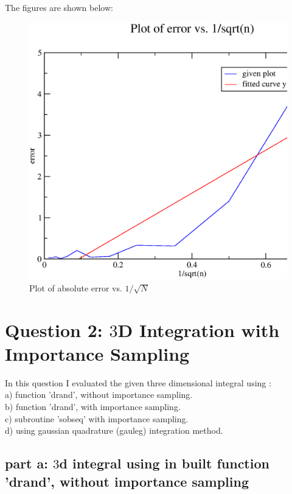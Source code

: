 \documentclass[11pt,a4paper,english]{article}
\begin{document}
	
	    The figures are shown below:\\
	\begin{figure}[h!]
	\centering
	\includegraphics [scale=0.6]{figures/hw9qn1c.eps}
	\caption{Plot of absolute error vs. $1/\sqrt{N}$ }
	\end{figure}
	\clearpage
\section{Question 2: $3$D Integration with Importance Sampling  }

	In this question I evaluated the given three dimensional integral using :\\
	a) function 'drand', without importance sampling.\\
	b) function 'drand', with importance sampling.\\
	c) subroutine 'sobseq' with importance sampling.\\
	d) using gaussian quadrature (gauleg) integration method.\\	
   	
	\subsection{part a: $3$d integral using in built function 'drand', without importance sampling }
	
\end{document}
